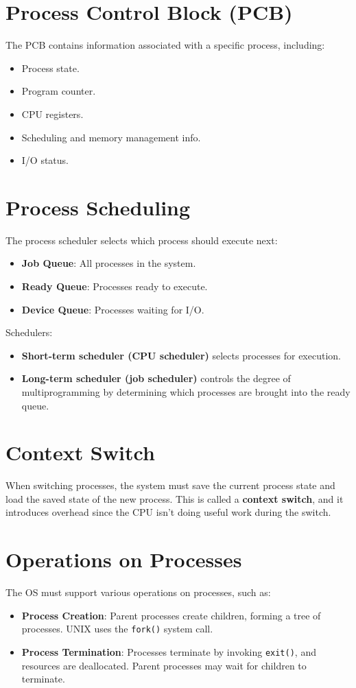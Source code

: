 \documentclass{article}
\begin{document}
\section{Process Control Block (PCB)}
The PCB contains information associated with a specific process, including:
\begin{itemize}
    \item Process state.
    \item Program counter.
    \item CPU registers.
    \item Scheduling and memory management info.
    \item I/O status.
\end{itemize}

\section{Process Scheduling}
The process scheduler selects which process should execute next:
\begin{itemize}
    \item \textbf{Job Queue}: All processes in the system.
    \item \textbf{Ready Queue}: Processes ready to execute.
    \item \textbf{Device Queue}: Processes waiting for I/O.
\end{itemize}

Schedulers:
\begin{itemize}
    \item \textbf{Short-term scheduler (CPU scheduler)} selects processes for execution.
    \item \textbf{Long-term scheduler (job scheduler)} controls the degree of multiprogramming by determining which processes are brought into the ready queue.
\end{itemize}

\section{Context Switch}
When switching processes, the system must save the current process state and load the saved state of the new process. This is called a \textbf{context switch}, and it introduces overhead since the CPU isn't doing useful work during the switch.

\section{Operations on Processes}
The OS must support various operations on processes, such as:
\begin{itemize}
    \item \textbf{Process Creation}: Parent processes create children, forming a tree of processes. UNIX uses the \texttt{fork()} system call.
    \item \textbf{Process Termination}: Processes terminate by invoking \texttt{exit()}, and resources are deallocated. Parent processes may wait for children to terminate.
\end{itemize}
\end{document}
